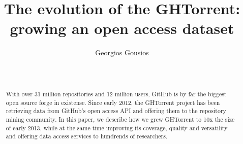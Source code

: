 \documentclass{sig-alternate}
\begin{document}






%

\title{The evolution of the GHTorrent: growing an open access dataset}
%
\author{
%
\alignauthor Georgios Gousios\\
       \\
       \\
}

\maketitle
\begin{abstract}

With over 31 million repositories and 12 million users, GitHub is by far the
biggest open source forge in existense. Since early 2012, the GHTorrent project
has been retrieving data from GitHub's open access API and offering them to the
repository mining community.  In this paper, we describe how we grew GHTorrent
to 10x the size of early 2013, while at the same time improving its coverage,
quality and versatility and offering data access services to hundrends of
researchers.

\end{abstract}
\end{document}

